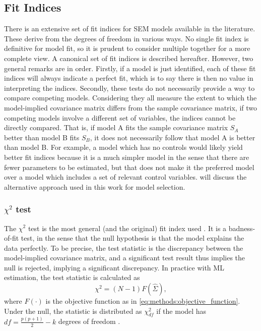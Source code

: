 \subsection{Fit Indices}
\label{sec:methods:fit_indices}
There is an extensive set of fit indices for SEM models available in the literature. These derive from the degrees of freedom
in various ways. No single fit index is definitive for model fit, so it is prudent to consider multiple together
for a more complete view. A canonical set of fit indices is described hereafter. However, two general remarks are in order.
Firstly, if a model is just identified, each of these fit indices will always indicate a perfect fit, which is to
say there is then no value in interpreting the indices.
Secondly, these tests do not necessarily provide a way to compare competing models. Considering they all measure the
extent to which the model-implied covariance matrix differs from the sample covariance matrix, if two competing models
involve a different set of variables, the indices cannot be directly compared. That is, if model A fits the sample
covariance matrix $S_A$ better than model B fits $S_B$, it does not necessarily follow that model A is better than model B.
For example, a model which has no controls would likely yield better fit indices because it is a much simpler model
in the sense that there are fewer parameters to be estimated,
but that does not make it the preferred model over a model which includes a set of relevant control variables.
 will discuss the alternative approach used in this work for model selection.

\subsubsection{$\chi^2$ test}
The $\chi^2$ test is the most general (and the original) fit index used \cite{smith2001primer}. It is a badness-of-fit
test, in the sense that the null hypothesis is that the model explains the data perfectly. To be precise,
the test statistic is the discrepancy between the model-implied covariance matrix, and a significant test result
thus implies the null is rejected, implying a significant discrepancy.
In practice with ML estimation, the test statistic is calculated as
\begin{equation}
    \label{eq:methods:chi2_test_stat}
    \chi^2 = (N - 1) F(\hat{\Sigma}),
\end{equation}
where $F(\cdot)$ is the objective function as in \cref{eq:methods:objective_function}.
Under the null, the statistic is distributed as $\chi^2_{df}$ if the model has $df = \frac{p(p + 1)}{2} - k$ degrees of freedom
\cite{zheng2025enhancing}.

